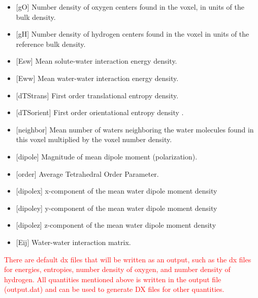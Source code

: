 \documentclass[9pt,tutorial]{livecoms}
\newcommand{\todo}{\textcolor{red}}
\begin{document}
\begin{itemize}
	\item{[gO] Number density of oxygen centers found in the voxel, in units of the bulk density.}
	\item{[gH] Number density of hydrogen centers found in the voxel in units of the reference bulk density.}
	\item{[Esw] Mean solute-water interaction energy density.}
	\item{[Eww] Mean water-water interaction energy density.}
	\item{[dTStrans] First order translational entropy density.}
	\item{[dTSorient] First order orientational entropy density .}
	\item{[neighbor] Mean number of waters neighboring the water molecules found in this voxel multiplied by the voxel number density.}
	\item{[dipole] Magnitude of mean dipole moment (polarization).}
	\item{[order] Average Tetrahedral Order Parameter.}
	\item{[dipolex] x-component of the mean water dipole moment density}
	\item{[dipoley] y-component of the mean water dipole moment density}
	\item{[dipolez] z-component of the mean water dipole moment density}
	\item{[Eij] Water-water interaction matrix.}
\end{itemize}

\todo{There are default dx files that will be written as an output, such as the dx files for energies, entropies, number density of oxygen, and number density of hydrogen. All quantities mentioned above is written in the output file (output.dat) and can be used to generate DX files for other quantities.}
\end{document}
